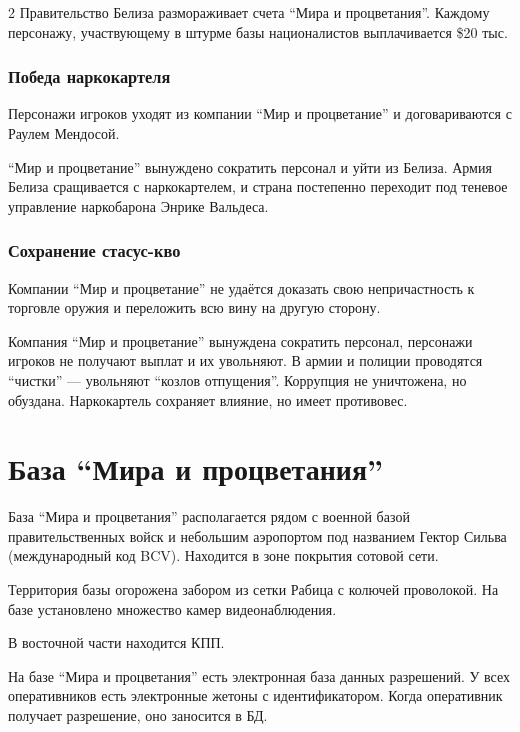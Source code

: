 \documentclass[twoside]{article}
\begin{document}
\begin{multicols}{2}
Правительство Белиза размораживает счета \enquote{Мира и процветания}. Каждому
персонажу, участвующему в штурме базы националистов выплачивается \$20
тыс.

\subsubsection{Победа наркокартеля}\label{cartel-victory}

Персонажи игроков уходят из компании \enquote{Мир и процветание} и
договариваются с Раулем Мендосой.

\enquote{Мир и процветание} вынуждено сократить персонал и уйти из Белиза. Армия
Белиза сращивается с наркокартелем, и страна постепенно переходит под
теневое управление наркобарона Энрике Вальдеса.

\subsubsection{Сохранение стасус-кво}\label{status-quo}

Компании \enquote{Мир и процветание} не удаётся доказать свою непричастность к
торговле оружия и переложить всю вину на другую сторону.

Компания \enquote{Мир и процветание} вынуждена сократить персонал, персонажи
игроков не получают выплат и их увольняют. В армии и полиции проводятся
\enquote{чистки} --- увольняют \enquote{козлов отпущения}. Коррупция не уничтожена, но
обуздана. Наркокартель сохраняет влияние, но имеет противовес.

\section{База \enquote{Мира и процветания}}\label{pap-base}

База \enquote{Мира и процветания} располагается рядом с военной базой
правительственных войск и небольшим аэропортом под названием Гектор
Сильва (международный код BCV). Находится в зоне покрытия сотовой сети.

Территория базы огорожена забором из сетки Рабица с колючей проволокой.
На базе установлено множество камер видеонаблюдения.

В восточной части находится КПП.

На базе \enquote{Мира и процветания} есть электронная база данных разрешений. У
всех оперативников есть электронные жетоны с идентификатором. Когда
оперативник получает разрешение, оно заносится в БД.


\end{multicols}
\end{document}
